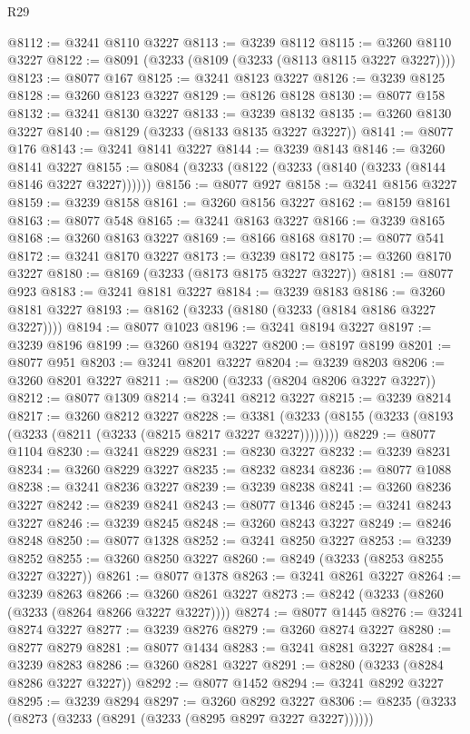 \begin{lexlean}{R29}
\begin{coremodule}
@8112 := @3241 @8110 @3227
@8113 := @3239 @8112
@8115 := @3260 @8110 @3227
@8122 := @8091 (@3233 (@8109 (@3233 (@8113 @8115 @3227 @3227))))
@8123 := @8077 @167
@8125 := @3241 @8123 @3227
@8126 := @3239 @8125
@8128 := @3260 @8123 @3227
@8129 := @8126 @8128
@8130 := @8077 @158
@8132 := @3241 @8130 @3227
@8133 := @3239 @8132
@8135 := @3260 @8130 @3227
@8140 := @8129 (@3233 (@8133 @8135 @3227 @3227))
@8141 := @8077 @176
@8143 := @3241 @8141 @3227
@8144 := @3239 @8143
@8146 := @3260 @8141 @3227
@8155 := @8084 (@3233 (@8122 (@3233 (@8140 (@3233 (@8144 @8146 @3227 @3227))))))
@8156 := @8077 @927
@8158 := @3241 @8156 @3227
@8159 := @3239 @8158
@8161 := @3260 @8156 @3227
@8162 := @8159 @8161
@8163 := @8077 @548
@8165 := @3241 @8163 @3227
@8166 := @3239 @8165
@8168 := @3260 @8163 @3227
@8169 := @8166 @8168
@8170 := @8077 @541
@8172 := @3241 @8170 @3227
@8173 := @3239 @8172
@8175 := @3260 @8170 @3227
@8180 := @8169 (@3233 (@8173 @8175 @3227 @3227))
@8181 := @8077 @923
@8183 := @3241 @8181 @3227
@8184 := @3239 @8183
@8186 := @3260 @8181 @3227
@8193 := @8162 (@3233 (@8180 (@3233 (@8184 @8186 @3227 @3227))))
@8194 := @8077 @1023
@8196 := @3241 @8194 @3227
@8197 := @3239 @8196
@8199 := @3260 @8194 @3227
@8200 := @8197 @8199
@8201 := @8077 @951
@8203 := @3241 @8201 @3227
@8204 := @3239 @8203
@8206 := @3260 @8201 @3227
@8211 := @8200 (@3233 (@8204 @8206 @3227 @3227))
@8212 := @8077 @1309
@8214 := @3241 @8212 @3227
@8215 := @3239 @8214
@8217 := @3260 @8212 @3227
@8228 := @3381 (@3233 (@8155 (@3233 (@8193 (@3233 (@8211 (@3233 (@8215 @8217 @3227 @3227))))))))
@8229 := @8077 @1104
@8230 := @3241 @8229
@8231 := @8230 @3227
@8232 := @3239 @8231
@8234 := @3260 @8229 @3227
@8235 := @8232 @8234
@8236 := @8077 @1088
@8238 := @3241 @8236 @3227
@8239 := @3239 @8238
@8241 := @3260 @8236 @3227
@8242 := @8239 @8241
@8243 := @8077 @1346
@8245 := @3241 @8243 @3227
@8246 := @3239 @8245
@8248 := @3260 @8243 @3227
@8249 := @8246 @8248
@8250 := @8077 @1328
@8252 := @3241 @8250 @3227
@8253 := @3239 @8252
@8255 := @3260 @8250 @3227
@8260 := @8249 (@3233 (@8253 @8255 @3227 @3227))
@8261 := @8077 @1378
@8263 := @3241 @8261 @3227
@8264 := @3239 @8263
@8266 := @3260 @8261 @3227
@8273 := @8242 (@3233 (@8260 (@3233 (@8264 @8266 @3227 @3227))))
@8274 := @8077 @1445
@8276 := @3241 @8274 @3227
@8277 := @3239 @8276
@8279 := @3260 @8274 @3227
@8280 := @8277 @8279
@8281 := @8077 @1434
@8283 := @3241 @8281 @3227
@8284 := @3239 @8283
@8286 := @3260 @8281 @3227
@8291 := @8280 (@3233 (@8284 @8286 @3227 @3227))
@8292 := @8077 @1452
@8294 := @3241 @8292 @3227
@8295 := @3239 @8294
@8297 := @3260 @8292 @3227
@8306 := @8235 (@3233 (@8273 (@3233 (@8291 (@3233 (@8295 @8297 @3227 @3227))))))

\end{coremodule}
\end{lexlean}
